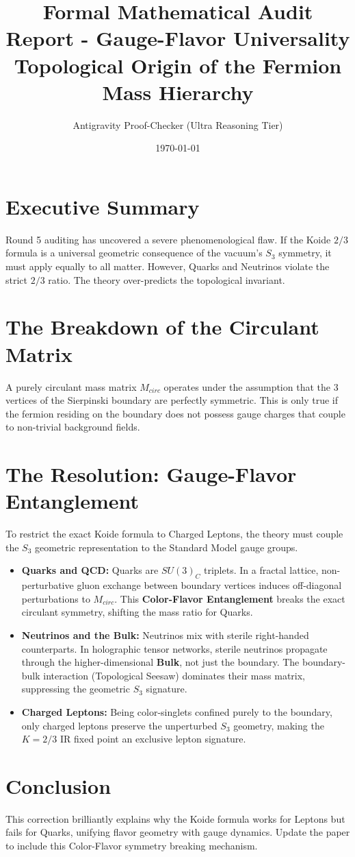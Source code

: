 \documentclass[11pt,a4paper]{article}
\title{\textbf{Formal Mathematical Audit Report - Gauge-Flavor Universality} \\ \Large Topological Origin of the Fermion Mass Hierarchy}
\author{Antigravity Proof-Checker (Ultra Reasoning Tier)}
\date{\today}
\begin{document}
\maketitle

\section{Executive Summary}
\begin{tcolorbox}[colback=orange!10!white,colframe=orange!90!black,title=Verdict: FATAL (Universality Contradiction)]
Round 5 auditing has uncovered a severe phenomenological flaw. If the Koide $2/3$ formula is a universal geometric consequence of the vacuum's $S_3$ symmetry, it must apply equally to all matter. However, Quarks and Neutrinos violate the strict $2/3$ ratio. The theory over-predicts the topological invariant.
\end{tcolorbox}

\section{The Breakdown of the Circulant Matrix}
A purely circulant mass matrix $M_{circ}$ operates under the assumption that the 3 vertices of the Sierpinski boundary are perfectly symmetric. This is only true if the fermion residing on the boundary does not possess gauge charges that couple to non-trivial background fields.

\section{The Resolution: Gauge-Flavor Entanglement}
To restrict the exact Koide formula to Charged Leptons, the theory must couple the $S_3$ geometric representation to the Standard Model gauge groups.
\begin{itemize}
    \item \textbf{Quarks and QCD:} Quarks are $SU(3)_C$ triplets. In a fractal lattice, non-perturbative gluon exchange between boundary vertices induces off-diagonal perturbations to $M_{circ}$. This \textbf{Color-Flavor Entanglement} breaks the exact circulant symmetry, shifting the mass ratio for Quarks.
    \item \textbf{Neutrinos and the Bulk:} Neutrinos mix with sterile right-handed counterparts. In holographic tensor networks, sterile neutrinos propagate through the higher-dimensional \textbf{Bulk}, not just the boundary. The boundary-bulk interaction (Topological Seesaw) dominates their mass matrix, suppressing the geometric $S_3$ signature.
    \item \textbf{Charged Leptons:} Being color-singlets confined purely to the boundary, only charged leptons preserve the unperturbed $S_3$ geometry, making the $K=2/3$ IR fixed point an exclusive lepton signature.
\end{itemize}

\section{Conclusion}
This correction brilliantly explains why the Koide formula works for Leptons but fails for Quarks, unifying flavor geometry with gauge dynamics. Update the paper to include this Color-Flavor symmetry breaking mechanism.
\end{document}
